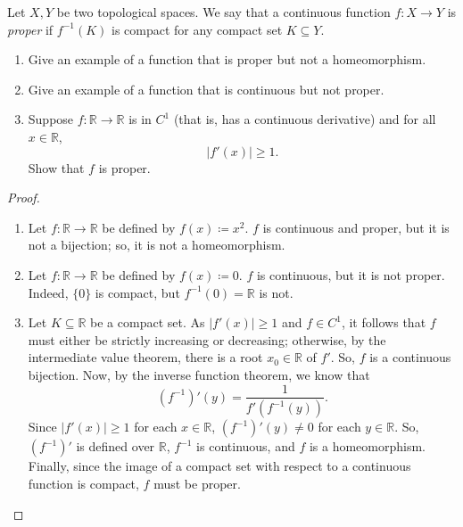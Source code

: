 \documentclass{article}
\begin{document}
\begin{problem}[Spring 2005~\#7]
Let \(X,Y\) be two topological spaces.  We say that a continuous function
\(f: X\to Y\) is \textit{proper} if \(f^{-1}(K)\) is compact for any compact
set \(K\subseteq Y\).
\begin{enumerate}
	\item Give an example of a function that is proper but not a homeomorphism.
	\item Give an example of a function that is continuous but not proper.
	\item Suppose \(f:\mathbb{R}\to \mathbb{R}\) is in \(C^1\) (that is, has a
	      continuous derivative) and for all \(x\in \mathbb{R}\),
	      \[
		      \left\lvert f'(x)\right\lvert \geq  1
		      .\]
	      Show that \(f\) is proper.
\end{enumerate}
\end{problem}
\begin{proof}\leavevmode
	\begin{enumerate}
		\item Let \(f: \mathbb{R}\to \mathbb{R}\) be defined by \(f(x)\coloneqq
		      x^2\).  \(f\) is continuous and proper, but it is not a bijection; so, it is
		      not a homeomorphism.
		\item Let \(f: \mathbb{R}\to \mathbb{R}\) be defined by \(f(x)\coloneqq
		      0\).  \(f\) is continuous, but it is not proper.  Indeed, \(\{0\}\)
		      is compact, but \(f^{-1}(0) = \mathbb{R}\) is not.
		\item Let \(K\subseteq \mathbb{R}\) be a compact set.  As \(|f'(x)|\ge 1\)
		      and \(f\in C^1\), it follows that \(f\) must either be strictly
		      increasing or decreasing; otherwise, by the intermediate value
		      theorem, there is a root \(x_0\in \mathbb{R}\) of \(f'\).  So, \(f\)
		      is a continuous bijection.  Now, by the inverse function theorem, we
		      know that
		      \[
			      \left(f^{-1}\right)'(y) = \frac{1}{f' \left(f^{-1}(y)\right)}
			      .\]
		      Since \(|f'(x)|\ge 1\) for each \(x\in \mathbb{R}\),
		      \(\left(f^{-1}\right)'(y)\neq 0\) for each \(y\in \mathbb{R}\).  So,
		      \(\left(f^{-1}\right)'\) is defined over \(\mathbb{R}\), \(f^{-1}\)
		      is continuous, and \(f\) is a homeomorphism.  Finally, since the
		      image of a compact set with respect to a continuous function is
		      compact, \(f\) must be proper.
	\end{enumerate}
\end{proof}
\end{document}

